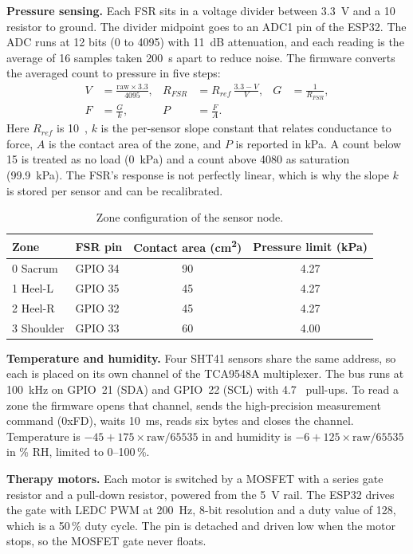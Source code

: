 \textbf{Pressure sensing.} Each FSR sits in a voltage divider between 3.3~V and a 10~\kohm{} resistor to ground. The divider midpoint goes to an ADC1 pin of the ESP32. The ADC runs at 12 bits (0 to 4095) with 11~dB attenuation, and each reading is the average of 16 samples taken 200~\textmu s apart to reduce noise. The firmware converts the averaged count to pressure in five steps:
\begin{align}
V &= \frac{\mathrm{raw}\times 3.3}{4095}, &
R_{FSR} &= R_{ref}\,\frac{3.3-V}{V}, &
G &= \frac{1}{R_{FSR}},\\
F &= \frac{G}{k}, &
P &= \frac{F}{A}.
\end{align}
Here $R_{ref}$ is 10~\kohm{}, $k$ is the per-sensor slope constant that relates conductance to force, $A$ is the contact area of the zone, and $P$ is reported in kPa. A count below 15 is treated as no load (0~kPa) and a count above 4080 as saturation (99.9~kPa). The FSR's response is not perfectly linear, which is why the slope $k$ is stored per sensor and can be recalibrated.

{\small{}
\begin{table}[H]
\centering
\begin{tabular}{@{}llcc@{}}
\toprule
\textbf{Zone} & \textbf{FSR pin} & \textbf{Contact area (cm\textsuperscript{2})} & \textbf{Pressure limit (kPa)}\\
\midrule
0 Sacrum & GPIO 34 & 90 & 4.27\\
1 Heel-L & GPIO 35 & 45 & 4.27\\
2 Heel-R & GPIO 32 & 45 & 4.27\\
3 Shoulder & GPIO 33 & 60 & 4.00\\
\bottomrule
\end{tabular}
\caption{Zone configuration of the sensor node.}
\end{table}}

\textbf{Temperature and humidity.} Four SHT41 sensors share the same \itwoc{} address, so each is placed on its own channel of the TCA9548A multiplexer. The bus runs at 100~kHz on GPIO~21 (SDA) and GPIO~22 (SCL) with 4.7~\kohm{} pull-ups. To read a zone the firmware opens that channel, sends the high-precision measurement command (0xFD), waits 10~ms, reads six bytes and closes the channel. Temperature is $-45 + 175\times\mathrm{raw}/65535$ in \degC{} and humidity is $-6 + 125\times\mathrm{raw}/65535$ in \% RH, limited to 0--100\,\%.

\textbf{Therapy motors.} Each motor is switched by a MOSFET with a series gate resistor and a pull-down resistor, powered from the 5~V rail. The ESP32 drives the gate with LEDC PWM at 200~Hz, 8-bit resolution and a duty value of 128, which is a 50\,\% duty cycle. The pin is detached and driven low when the motor stops, so the MOSFET gate never floats.

